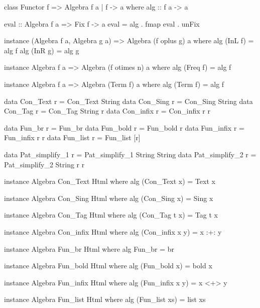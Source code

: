 \begin{code}
class Functor f => Algebra f a | f -> a where
  alg :: f a -> a
\end{code}


\begin{code}
eval :: Algebra f a => Fix f -> a
eval = alg . fmap eval . unFix
\end{code}


\begin{code}
instance (Algebra f a, Algebra g a) => Algebra (f oplus g) a
  where  alg (InL f) = alg f
         alg (InR g) = alg g

instance Algebra f a => Algebra (f otimes n) a
  where alg (Freq f) = alg f

instance Algebra f a => Algebra (Term f) a
  where alg (Term f) = alg f
\end{code}


\begin{code}
data Con_Text   r = Con_Text String
data Con_Sing   r = Con_Sing String
data Con_Tag    r = Con_Tag  String r
data Con_infix  r = Con_infix r r
\end{code}

\begin{code}
data Fun_br     r = Fun_br
data Fun_bold   r = Fun_bold r
data Fun_infix  r = Fun_infix r r
data Fun_list   r = Fun_list [r]
\end{code}

\begin{code}
data Pat_simplify_1 r = Pat_simplify_1 String String
data Pat_simplify_2 r = Pat_simplify_2 String r r
\end{code}

\begin{code}
instance Algebra Con_Text Html where
  alg (Con_Text x) = Text x

instance Algebra Con_Sing Html where
  alg (Con_Sing x) = Sing x

instance Algebra Con_Tag Html where
  alg (Con_Tag t x) = Tag t x

instance Algebra Con_infix Html where
  alg (Con_infix x y) = x :+: y
\end{code}

\begin{code}
instance Algebra Fun_br Html where
  alg Fun_br = br

instance Algebra Fun_bold Html where
  alg (Fun_bold x) = bold x

instance Algebra Fun_infix Html where
  alg (Fun_infix x y) = x <+> y

instance Algebra Fun_list Html where
  alg (Fun_list xs) = list xs
\end{code}


